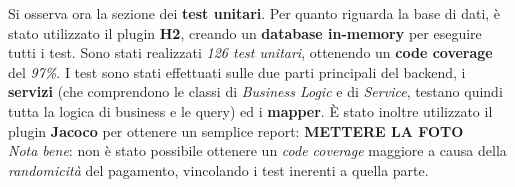 \documentclass{article}
\begin{document}
Si osserva ora la sezione dei \textbf{test unitari}. Per quanto riguarda la base di dati, è stato utilizzato il plugin \textbf{H2}, creando un \textbf{database in-memory} per eseguire tutti i test. Sono stati realizzati \textit{126 test unitari}, ottenendo un \textbf{code coverage} del \textit{97\%}. I test sono stati effettuati sulle due parti principali del backend, i \textbf{servizi} (che comprendono le classi di \textit{Business Logic} e di \textit{Service}, testano quindi tutta la logica di business e le query) ed i \textbf{mapper}. È stato inoltre utilizzato il plugin \textbf{Jacoco} per ottenere un semplice report:
\textbf{METTERE LA FOTO}\vspace*{7pt}\\
\textit{Nota bene}: non è stato possibile ottenere un \textit{code coverage} maggiore a causa della \textit{randomicità} del pagamento, vincolando i test inerenti a quella parte.
\end{document}
